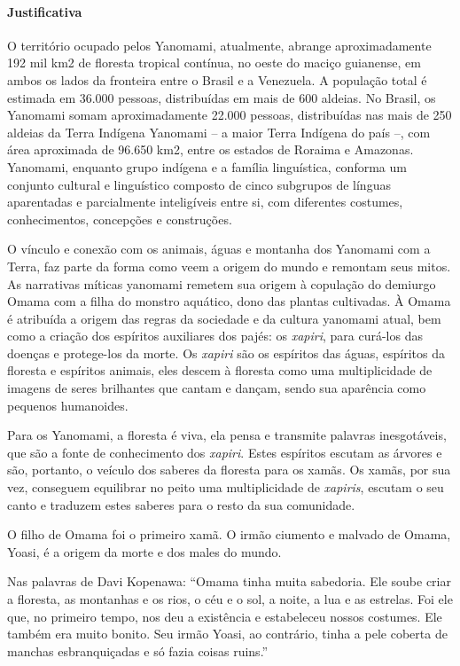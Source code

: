 \documentclass[12pt]{extarticle}
\begin{document}
\paragraph{Justificativa} O território ocupado pelos Yanomami, atualmente, abrange 
aproximadamente 192 mil km2 de floresta tropical contínua, no oeste do maciço 
guianense, em ambos os lados da fronteira entre o Brasil e a Venezuela. A população 
total é estimada em 36.000 pessoas, distribuídas em  mais de 600 aldeias. 
No Brasil, os Yanomami somam aproximadamente 22.000 pessoas, distribuídas 
nas mais de 250 aldeias da Terra Indígena Yanomami – a maior Terra Indígena 
do país –, com área aproximada de 96.650 km2, entre os estados de Roraima e 
Amazonas. Yanomami, enquanto grupo indígena e a família linguística, conforma
um conjunto cultural e linguístico composto de cinco subgrupos de línguas 
aparentadas e parcialmente inteligíveis entre si, com diferentes costumes, 
conhecimentos, concepções e construções.

O vínculo e conexão com os animais, águas e montanha dos Yanomami com a 
Terra, faz parte da forma como veem a origem do mundo e remontam seus mitos. 
As narrativas míticas yanomami remetem sua origem à copulação do demiurgo 
Omama com a filha do monstro aquático, dono das plantas cultivadas. À Omama
é atribuída a origem das regras da sociedade e da cultura yanomami atual,
bem como a criação dos espíritos auxiliares dos pajés: os \emph{xapiri}, 
para curá-los das doenças e protege-los da morte. Os \emph{xapiri} são os 
espíritos das águas, espíritos da floresta e espíritos animais, eles descem 
à floresta como uma multiplicidade de imagens de seres brilhantes que cantam 
e dançam, sendo sua aparência como pequenos humanoides.

Para os Yanomami, a floresta é viva, ela pensa e transmite palavras inesgotáveis,
que são a fonte de conhecimento dos \emph{xapiri}. Estes espíritos escutam as 
árvores e são, portanto, o veículo dos saberes da floresta para os xamãs. Os xamãs,
por sua vez, conseguem equilibrar no peito uma multiplicidade de \emph{xapiris}, 
escutam o seu canto e traduzem estes saberes para o resto da sua comunidade.

O filho de Omama foi o primeiro xamã. O irmão ciumento e malvado de Omama,
Yoasi, é a origem da morte e dos males do mundo.

Nas palavras de Davi Kopenawa: ``Omama  tinha muita sabedoria. Ele soube criar a 
floresta, as montanhas e os rios, o céu e o sol, a noite, a lua e as estrelas. 
Foi ele que, no primeiro tempo, nos deu a existência e estabeleceu nossos costumes. 
Ele também era muito bonito. Seu irmão Yoasi, ao contrário, tinha a pele coberta de 
manchas esbranquiçadas e só fazia coisas ruins.''
\end{document}
